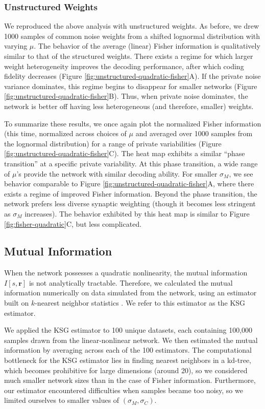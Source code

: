 \documentclass[11pt]{article}
\begin{document}
	\subsubsection{Unstructured Weights}
	We reproduced the above analysis with unstructured weights. As before, we drew   1000 samples of common noise weights from a shifted lognormal distribution with varying $\mu$. The behavior of the average (linear) Fisher information is qualitatively similar to that of the structured weights. There exists a regime for which larger weight heterogeneity improves the decoding performance, after which coding fidelity decreases (Figure \ref{fig:unstructured-quadratic-fisher}A). If the private noise variance dominates, this regime begins to disappear for smaller networks (Figure \ref{fig:unstructured-quadratic-fisher}B). Thus, when private noise dominates, the network is better off having less heterogeneous (and therefore, smaller) weights.
	
	To summarize these results, we once again plot the normalized Fisher information (this time, normalized across choices of $\mu$ and averaged over 1000 samples from the lognormal distribution) for a range of private variabilities (Figure \ref{fig:unstructured-quadratic-fisher}C).  The heat map exhibits a similar ``phase transition'' at a specific private variability. At this phase transition, a wide range of $\mu$'s provide the network with similar decoding ability. For smaller $\sigma_M$, we see behavior comparable to Figure \ref{fig:unstructured-quadratic-fisher}A, where there exists a regime of improved Fisher information. Beyond the phase transition, the network prefers less diverse synaptic weighting (though it becomes less stringent as $\sigma_M$ increases). The behavior exhibited by this heat map is similar to Figure \ref{fig:fisher-quadratic}C, but less complicated. 
	
\subsection{Mutual Information}
When the network possesses a quadratic nonlinearity, the mutual information $I[s,\mathbf{r}]$ is not analytically tractable. Therefore, we calculated the mutual information numerically on data simulated from the network, using an estimator built on $k$-nearest neighbor statistics \cite{kraskov}. We refer to this estimator as the KSG estimator. 

We applied the KSG estimator to 100 unique datasets, each containing 100,000 samples drawn from the linear-nonlinear network. We then estimated the mutual information by averaging across each of the 100 estimators. The computational bottleneck for the KSG estimator lies in finding nearest neighbors in a kd-tree, which becomes prohibitive for large dimensions (around 20), so we considered much smaller network sizes than in the case of Fisher information. Furthermore, our estimator encountered difficulties when samples became too noisy, so we limited ourselves to smaller values of $(\sigma_M, \sigma_C)$.
\end{document}
